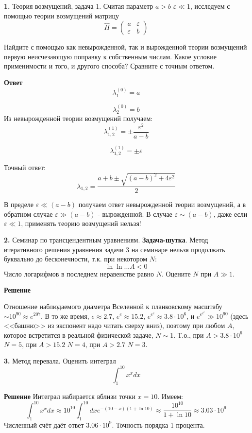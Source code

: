 \documentclass[a4paper,12pt]{article}
\begin{document}
\textbf{1.} Теория возмущений, задача 1. Считая параметр $a>b$ $\varepsilon\ll1$, исследуем с помощью теории возмущений матрицу 
\[
\hat{H}=
\begin{pmatrix}
a & \varepsilon \\
\varepsilon & b 
\end{pmatrix}
\]

Найдите с помощью как невырожденной, так и вырожденной теории возмущений первую неисчезающую поправку к собственным числам. Какое условие применимости и того, и другого способа? Сравните с точным ответом.

\textbf{Ответ}
$$
\lambda_1^{(0)}=a
$$

$$
\lambda_2^{(0)}=b
$$
Из невырожденной теории возмущений получаем:
$$
\lambda_{1,2}^{(1)}=\pm\frac{\varepsilon^2}{a-b}
$$

$$
\lambda_{1,2}^{(1)}=\pm\varepsilon
$$

Точный ответ:
$$
\lambda_{1,2}=\frac{a+b\pm\sqrt{(a-b)^2+4\varepsilon^2}}{2}
$$

В пределе $\varepsilon\ll\left(a-b\right)$ получаем ответ невырожденной теории возмущений, а в обратном случае $\varepsilon\gg\left(a-b\right)$ - вырожденной. В случае $\varepsilon\sim\left(a-b\right)$, даже если $\varepsilon\ll1$, применять теорию возмущений нельзя!

\textbf{2.} Семинар по трансцендентным уравнениям. \textbf{Задача-шутка}. Метод итеративного решения уравнения задачи 3 на семинаре нельзя продолжать буквально до бесконечности, т.к. при некотором $N$:
$$
\ln\ln... A<0
$$
Число логарифмов в последнем неравенстве равно $N$. Оцените $N$ при $A\gg1$. 

\textbf{Решение}

Отношение наблюдаемого диаметра Вселенной к планковскому масштабу $\sim 10^{90}\approx e^{207}$. В то же время, $e\approx 2.7$, $e^e\approx15.2$, $e^{e^e}\approx3.8\cdot10^6$, и $e^{e^{e^e}}\gg10^{90}$ (здесь <<башню>> из экспонент надо читать сверху вниз), поэтому при любом $A$, которое встретится в реальной физической задаче, $N\sim1$. Т.о., при $A>3.8\cdot10^6$ $N=5$, при $A>15.2$ $N=4$, при $A>2.7$ $N=3$.

\textbf{3.} Метод перевала. Оценить интеграл
$$
\int_{1}^{10}x^x dx
$$

\textbf{Решение} Интеграл набирается вблизи точки $x=10$. Имеем:
$$
\int_{1}^{10}x^x dx\approx10^{10}\int_1^{10}dx e^{-(10-x)(1+\ln10)}\approx\frac{10^{10}}{1+\ln10}\approx3.03\cdot10^9
$$
Численный счёт даёт ответ $3.06\cdot10^9$. Точность порядка 1 процента.
\end{document}
